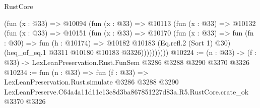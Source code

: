 \begin{lexlean}{RustCore}
\begin{coremodule}
          (fun (x : @33) =>
          @10094
            (fun (x : @33) =>
            @10113
              (fun (x : @33) =>
              @10132
                (fun (x : @33) =>
                @10151
                  (fun (x : @33) =>
                  @10170
                    (fun (x : @33) =>
                    fun (fn : @30) =>
                    fun (h : @10174) =>
                    @10182
                      @10183
                      (Eq.refl.{2} (Sort 1) @30)
                      (heq_of_eq.{1} @3311 @10180 @10183 @3326))))))))))
@10224 := (n : @33) -> (f : @33) -> LexLeanPreservation.Rust.FunSem @3286 @3288 @3290 @3370 @3326
@10234 := fun (n : @33) =>
  fun (f : @33) =>
  LexLeanPreservation.Rust.simulate
    @3286
    @3288
    @3290
    LexLeanPreserve.C64a4a11d11c13c8d3ba867851227d83a.R5.RustCore.crate_ok
    @3370
    @3326
\end{coremodule}
\end{lexlean}
